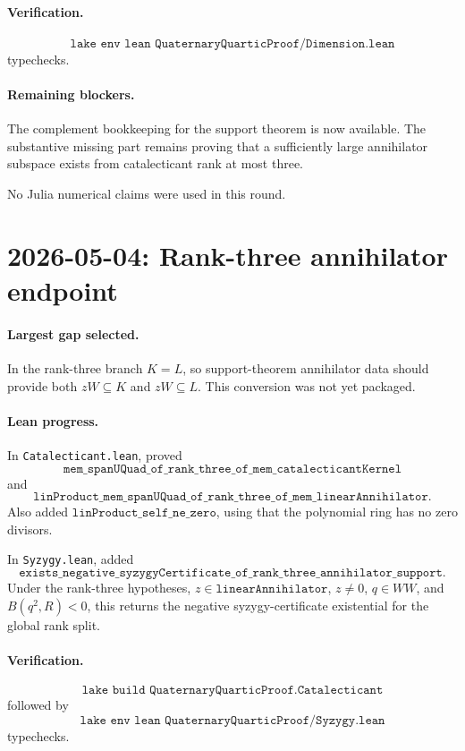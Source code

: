 \documentclass[11pt]{article}
\begin{document}
\paragraph{Verification.}
\[
\texttt{lake env lean QuaternaryQuarticProof/Dimension.lean}
\]
typechecks.

\paragraph{Remaining blockers.}
The complement bookkeeping for the support theorem is now available.  The
substantive missing part remains proving that a sufficiently large
annihilator subspace exists from catalecticant rank at most three.

No Julia numerical claims were used in this round.

\section*{2026-05-04: Rank-three annihilator endpoint}

\paragraph{Largest gap selected.}
In the rank-three branch \(K=L\), so support-theorem annihilator data should
provide both \(zW\subseteq K\) and \(zW\subseteq L\).  This conversion was not
yet packaged.

\paragraph{Lean progress.}
In \texttt{Catalecticant.lean}, proved
\[
\texttt{mem\_spanUQuad\_of\_rank\_three\_of\_mem\_catalecticantKernel}
\]
and
\[
\texttt{linProduct\_mem\_spanUQuad\_of\_rank\_three\_of\_mem\_linearAnnihilator}.
\]
Also added \(\texttt{linProduct\_self\_ne\_zero}\), using that the polynomial
ring has no zero divisors.

In \texttt{Syzygy.lean}, added
\[
\texttt{exists\_negative\_syzygyCertificate\_of\_rank\_three\_annihilator\_support}.
\]
Under the rank-three hypotheses, \(z\in\texttt{linearAnnihilator}\),
\(z\neq0\), \(q\in WW\), and \(B(q^2,R)<0\), this returns the negative
syzygy-certificate existential for the global rank split.

\paragraph{Verification.}
\[
\texttt{lake build QuaternaryQuarticProof.Catalecticant}
\]
followed by
\[
\texttt{lake env lean QuaternaryQuarticProof/Syzygy.lean}
\]
typechecks.
\end{document}
